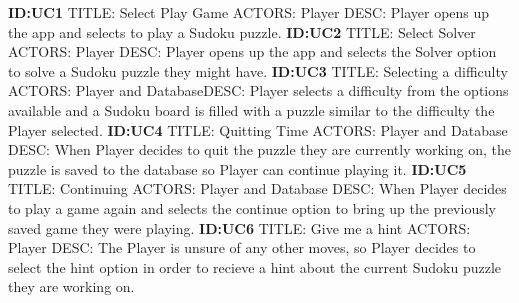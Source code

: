 \documentclass{article}
\begin{document}
\textbf{ID:UC1} \newline TITLE: Select Play Game \newline ACTORS: Player \newline DESC: Player opens up the app and selects to play a Sudoku puzzle. \newline \newline
\textbf{ID:UC2} \newline TITLE: Select Solver \newline ACTORS: Player \newline DESC: Player opens up the app and selects the Solver option to solve a Sudoku puzzle they might have. \newline \newline
\textbf{ID:UC3} \newline TITLE: Selecting a difficulty \newline ACTORS: Player and Database\newline DESC: Player selects a difficulty from the options available and a Sudoku board is filled with a puzzle similar to the difficulty the Player selected. \newline \newline
\textbf{ID:UC4} \newline TITLE: Quitting Time \newline ACTORS: Player and Database \newline DESC: When Player decides to quit the puzzle they are currently working on, the puzzle is saved to the database so Player can continue playing it.  \newline \newline
\textbf{ID:UC5} \newline TITLE: Continuing \newline ACTORS: Player and Database \newline DESC: When Player decides to play a game again and selects the continue option to bring up the previously saved game they were playing. \newline \newline
\textbf{ID:UC6} \newline TITLE: Give me a hint \newline ACTORS: Player \newline DESC: The Player is unsure of any other moves, so Player decides to select the hint option in order to recieve a hint about the current Sudoku puzzle they are working on. \newline \newline
\end{document}
